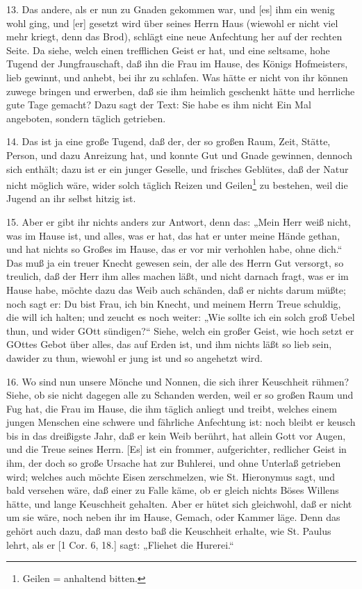 13. Das andere, als er nun zu Gnaden gekommen war, und [es] ihm ein wenig wohl ging, und [er] gesetzt wird über seines Herrn Haus (wiewohl er nicht viel mehr kriegt, denn das Brod), schlägt eine neue Anfechtung her auf der rechten Seite. Da siehe, welch einen trefflichen Geist er hat, und eine seltsame, hohe Tugend der Jungfrauschaft, daß ihn die Frau im Hause, des Königs Hofmeisters, lieb gewinnt, und anhebt, bei ihr zu schlafen. Was hätte er nicht von ihr können zuwege bringen und erwerben, daß sie ihm heimlich geschenkt hätte und herrliche gute Tage gemacht? Dazu sagt der Text: Sie habe es ihm nicht Ein Mal angeboten, sondern täglich getrieben.

14. Das ist ja eine große Tugend, daß der, der so großen Raum, Zeit, Stätte, Person, und dazu Anreizung hat, und konnte Gut und Gnade gewinnen, dennoch sich enthält; dazu ist er ein junger Geselle, und frisches Geblütes, daß der Natur nicht möglich wäre, wider solch täglich Reizen und Geilen\footnote{Geilen = anhaltend bitten.} zu bestehen, weil die Jugend an ihr selbst hitzig ist.

15. Aber er gibt ihr nichts anders zur Antwort, denn das: „Mein Herr weiß nicht, was im Hause ist, und alles, was er hat, das hat er unter meine Hände gethan, und hat nichts so Großes im Hause, das er vor mir verhohlen habe, ohne dich.“ Das muß ja ein treuer Knecht gewesen sein, der alle des Herrn Gut versorgt, so treulich, daß der Herr ihm alles machen läßt, und nicht darnach fragt, was er im Hause habe, möchte dazu das Weib auch schänden, daß er nichts darum müßte; noch sagt er: Du bist Frau, ich bin Knecht, und meinem Herrn Treue schuldig, die will ich halten; und zeucht es noch weiter: „Wie sollte ich ein solch groß Uebel thun, und wider GOtt sündigen?“ Siehe, welch ein großer Geist, wie hoch setzt er GOttes Gebot über alles, das auf Erden ist, und ihm nichts läßt so lieb sein, dawider zu thun, wiewohl er jung ist und so angehetzt wird.

16. Wo sind nun unsere Mönche und Nonnen, die sich ihrer Keuschheit rühmen? Siehe, ob sie nicht dagegen alle zu Schanden werden, weil er so großen Raum und Fug hat, die Frau im Hause, die ihm täglich anliegt und treibt, welches einem jungen Menschen eine schwere und fährliche Anfechtung ist: noch bleibt er keusch bis in das dreißigste Jahr, daß er kein Weib berührt, hat allein Gott vor Augen, und die Treue seines Herrn. [Es] ist ein frommer, aufgerichter, redlicher Geist in ihm, der doch so große Ursache hat zur Buhlerei, und ohne Unterlaß getrieben wird; welches auch möchte Eisen zerschmelzen, wie St. Hieronymus sagt, und bald versehen wäre, daß einer zu Falle käme, ob er gleich nichts Böses Willens hätte, und lange Keuschheit gehalten. Aber er hütet sich gleichwohl, daß er nicht um sie wäre, noch neben ihr im Hause, Gemach, oder Kammer läge. Denn das gehört auch dazu, daß man desto baß die Keuschheit erhalte, wie St. Paulus lehrt, als er [1 Cor. 6, 18.] sagt: „Fliehet die Hurerei.“

